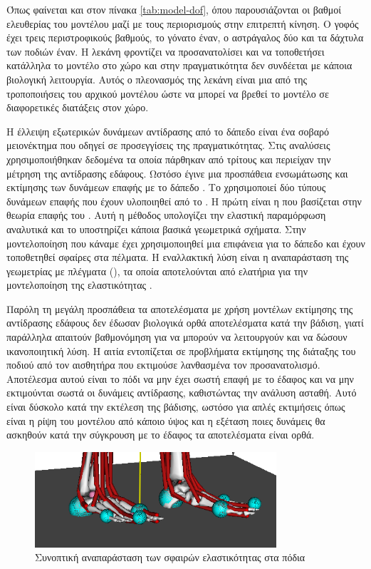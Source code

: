 Όπως φαίνεται και στον πίνακα \ref{tab:model-dof}, όπου παρουσιάζονται οι βαθμοί ελευθερίας του μοντέλου μαζί με τους περιορισμούς στην επιτρεπτή κίνηση. Ο γοφός έχει τρεις περιστροφικούς βαθμούς, το γόνατο έναν, ο αστράγαλος δύο και τα δάχτυλα των ποδιών έναν. Η λεκάνη φροντίζει να προσανατολίσει και να τοποθετήσει κατάλληλα το μοντέλο στο χώρο και στην πραγματικότητα δεν συνδέεται με κάποια βιολογική λειτουργία. Αυτός ο πλεονασμός της λεκάνη είναι μια από της τροποποιήσεις του αρχικού μοντέλου ώστε να μπορεί να βρεθεί το μοντέλο σε διαφορετικές διατάξεις στον χώρο.

Η έλλειψη εξωτερικών δυνάμεων αντίδρασης από το δάπεδο είναι ένα σοβαρό μειονέκτημα που οδηγεί σε προσεγγίσεις της πραγματικότητας. Στις αναλύσεις χρησιμοποιήθηκαν δεδομένα τα οποία πάρθηκαν από τρίτους και περιείχαν την μέτρηση της αντίδρασης εδάφους. Ωστόσο έγινε μια προσπάθεια ενσωμάτωσης και εκτίμησης των δυνάμεων επαφής με το δάπεδο \cite{seitha11}. Το  χρησιμοποιεί δύο τύπους δυνάμεων επαφής που έχουν υλοποιηθεί από το . Η πρώτη είναι η  που βασίζεται στην θεωρία επαφής του  \cite{hunt75}. Αυτή η μέθοδος υπολογίζει την ελαστική παραμόρφωση αναλυτικά και το  υποστηρίζει κάποια βασικά γεωμετρικά σχήματα. Στην μοντελοποίηση που κάναμε έχει χρησιμοποιηθεί μια επιφάνεια για το δάπεδο και έχουν τοποθετηθεί σφαίρες στα πέλματα. Η εναλλακτική λύση είναι η αναπαράσταση της γεωμετρίας με πλέγματα (), τα οποία αποτελούνται από ελατήρια για την μοντελοποίηση της ελαστικότητας \cite{hertz82}.

Παρόλη τη μεγάλη προσπάθεια τα αποτελέσματα με χρήση μοντέλων εκτίμησης της αντίδρασης εδάφους δεν έδωσαν βιολογικά ορθά αποτελέσματα κατά την βάδιση, γιατί παράλληλα απαιτούν βαθμονόμηση για να μπορούν να λειτουργούν και να δώσουν ικανοποιητική λύση. Η αιτία εντοπίζεται σε προβλήματα εκτίμησης της διάταξης του ποδιού από τον αισθητήρα που εκτιμούσε λανθασμένα τον προσανατολισμό. Αποτέλεσμα αυτού είναι το πόδι να μην έχει σωστή επαφή με το έδαφος και να μην εκτιμούνται σωστά οι δυνάμεις αντίδρασης, καθιστώντας την ανάλυση ασταθή. Αυτό είναι δύσκολο κατά την εκτέλεση της βάδισης, ωστόσο για απλές εκτιμήσεις όπως είναι η ρίψη του μοντέλου από κάποιο ύψος και η εξέταση ποιες δυνάμεις θα ασκηθούν κατά την σύγκρουση με το έδαφος τα αποτελέσματα είναι ορθά.

\begin{figure}[H]
    \centering
    \includegraphics[width=0.8\textwidth, keepaspectratio]{fig/foot-contact.png}
    \caption{Συνοπτική αναπαράσταση των σφαιρών ελαστικότητας στα πόδια}
    \label{fig:foot-contact}
\end{figure}


